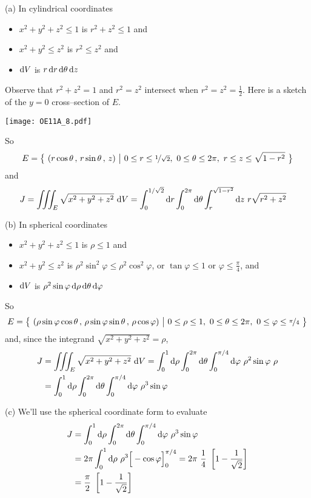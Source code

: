 \begin{solution}
(a)
In cylindrical coordinates
\begin{itemize}
\item
$x^2+y^2+z^2\le 1$ is $r^2+z^2\le 1$ and
\item
$x^2+y^2\le z^2$ is $r^2\le z^2$ and
\item
$\mathrm{d}V$ is $r\,\mathrm{d}r\,\mathrm{d}\theta\,\mathrm{d}z$
\end{itemize}
Observe that $r^2+z^2= 1$ and $r^2= z^2$ intersect when $r^2=z^2=\frac{1}{2}$.
Here is a sketch of the $y=0$ cross--section of $E$.
\begin{center}
     \texttt{[image: OE11A\_8.pdf]}
\end{center}
So
\begin{equation*}
E =\Set{(r\cos\theta\,,\,r\sin\theta\,,\,z)}{0\le r\le\nicefrac{1}{\sqrt{2}},\ 
                                             0\le\theta\le2\pi,\ 
                                              r\le z\le \sqrt{1-r^2}}
\end{equation*}
and
\begin{align*}
J &=\iiint_E \sqrt{x^2+y^2+z^2}\ \mathrm{d}V 
   =\int_0^{1/\sqrt{2}}\mathrm{d}r\int_0^{2\pi}\mathrm{d}\theta
           \int_r^{\sqrt{1-r^2}}\mathrm{d}z\ r\sqrt{r^2+z^2}
\end{align*}

(b)
In spherical coordinates
\begin{itemize}
\item
$x^2+y^2+z^2\le 1$ is $\rho\le 1$ and
\item
$x^2+y^2\le z^2$ is $\rho^2\sin^2\varphi\le \rho^2\cos^2\varphi$,
or $\tan\varphi\le 1$ or $\varphi\le\frac{\pi}{4}$, and
\item
$\mathrm{d}V$ is $\rho^2\sin\varphi\,\mathrm{d}\rho\,\mathrm{d}\theta\,\mathrm{d}\varphi$
\end{itemize}
So
\begin{equation*}
E =\Set{(\rho\sin\varphi\cos\theta\,,\,\rho\sin\varphi\sin\theta\,,\,
          \rho\cos\varphi)}{0\le\rho\le 1,\  0\le\theta\le2\pi,\ 
                            0\le \varphi\le \nicefrac{\pi}{4}}
\end{equation*}
and, since the integrand $\sqrt{x^2+y^2+z^2}=\rho$,
\begin{align*}
J &=\iiint_E \sqrt{x^2+y^2+z^2}\ \mathrm{d}V 
   =\int_0^{1}\mathrm{d}\rho\int_0^{2\pi}\mathrm{d}\theta
           \int_0^{\pi/4}\mathrm{d}\varphi\ \rho^2\sin\varphi\ \rho \\
   &=\int_0^{1}\mathrm{d}\rho\int_0^{2\pi}\mathrm{d}\theta
           \int_0^{\pi/4}\mathrm{d}\varphi\ \rho^3\sin\varphi
\end{align*}


(c) We'll use the spherical coordinate form to evaluate
\begin{align*}
J &=\int_0^{1}\mathrm{d}\rho\int_0^{2\pi}\mathrm{d}\theta
           \int_0^{\pi/4}\mathrm{d}\varphi\ \rho^3\sin\varphi \\
   &=2\pi \int_0^{1}\mathrm{d}\rho\ \rho^3
                     \Big[-\cos\varphi\Big]_0^{\pi/4} 
    =2\pi\ \frac{1}{4}\ \left[1-\frac{1}{\sqrt{2}}\right] \\
    &=\frac{\pi}{2}\ \left[1-\frac{1}{\sqrt{2}}\right]
\end{align*}
\end{solution}

